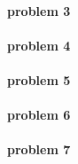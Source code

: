 \paragraph{problem 3}

\paragraph{problem 4}

\paragraph{problem 5}

\paragraph{problem 6}

\paragraph{problem 7}